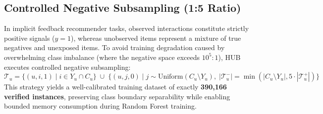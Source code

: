 \subsection{Controlled Negative Subsampling (1:5 Ratio)}
In implicit feedback recommender tasks, observed interactions constitute strictly positive signals ($y=1$), whereas unobserved items represent a mixture of true negatives and unexposed items. To avoid training degradation caused by overwhelming class imbalance (where the negative space exceeds $10^5:1$), HUB executes controlled negative subsampling:
\begin{equation}
    \mathcal{T}_u = \big\{(u, i, 1) \mid i \in Y_u \cap C_u\big\} \;\cup\; \big\{(u, j, 0) \mid j \sim \text{Uniform}(C_u \setminus Y_u), \; |\mathcal{T}_u^{-}| = \min(|C_u \setminus Y_u|, 5 \cdot |\mathcal{T}_u^{+}|)\big\}
\end{equation}
This strategy yields a well-calibrated training dataset of exactly \textbf{390,166 verified instances}, preserving class boundary separability while enabling bounded memory consumption during Random Forest training.
